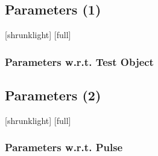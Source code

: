 \subsection{Parameters (1)}
[shrunklight]
[full]
\begin{frame}
	\frametitle{Parameters w.r.t. Test Object}
	\centering
	\begin{table}
	\begin{center}
	\end{center}
	\end{table}
\end{frame}


\subsection{Parameters (2)}
[shrunklight]
[full]
\begin{frame}
	\frametitle{Parameters w.r.t. Pulse}
	\centering
	\begin{columns}
	\begin{column}{0.5\textwidth}
	\begin{table}
	\begin{center}
	\end{center}
	\end{table}
	\end{column}
	\begin{column}{0.5\textwidth}
	\end{column}
	\end{columns}	
\end{frame}

